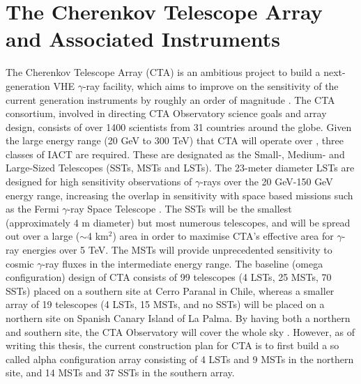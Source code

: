 \section{The Cherenkov Telescope Array and Associated Instruments}
The Cherenkov Telescope Array (CTA) is an ambitious project to build a next-generation VHE $\gamma$-ray facility, which aims to improve on the sensitivity of the current generation instruments by roughly an order of magnitude \cite{scienceCTA}. The CTA consortium, involved in directing CTA Observatory science goals and array design, consists of over 1400 scientists from 31 countries around the globe. Given the large energy range (20 GeV to 300 TeV) that CTA will operate  over \cite{scienceCTA}, three classes of IACT are required. These are designated as the Small-, Medium- and Large-Sized Telescopes (SSTs, MSTs and LSTs). The 23-meter diameter LSTs are designed for high sensitivity observations of $\gamma$-rays over the 20 GeV-150 GeV energy range, increasing the overlap in sensitivity with space based missions such as the Fermi $\gamma$-ray Space Telescope \cite{Fermi}. The SSTs will be the smallest (approximately 4 m diameter) but most numerous telescopes, and will be spread out over a large ($\sim$4 km$^2$) area in order to maximise CTA's effective area for $\gamma$-ray energies over 5 TeV. The MSTs will provide unprecedented sensitivity to cosmic $\gamma$-ray fluxes in the intermediate energy range. The baseline (omega configuration) design of CTA consists of 99 telescopes (4 LSTs, 25 MSTs, 70 SSTs) placed on a southern site at Cerro Paranal in Chile, whereas a smaller array of 19 telescopes (4 LSTs, 15 MSTs, and no SSTs) will be placed on a northern site on Spanish Canary Island of La Palma. By having both a northern and southern site, the CTA Observatory will cover the whole sky \cite{scienceCTA}. However, as of writing this thesis, the current construction plan for CTA is to first build a so called alpha configuration array consisting of 4 LSTs and 9 MSTs in the northern site, and 14 MSTs and 37 SSTs in the southern array.
